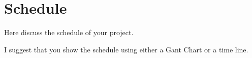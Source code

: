 \section{Schedule}

Here discuss the schedule of your project.

I suggest that you show the schedule using either a Gant Chart or a time line.